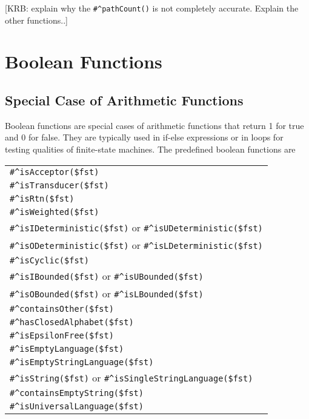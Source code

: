 \vspace{0.5cm}

[KRB:  explain why the \verb!#^pathCount()! is not completely accurate.
Explain the other functions..]  

\section{Boolean Functions}

\subsection{Special Case of Arithmetic Functions}

Boolean functions are special cases of arithmetic functions that return 1 for true and 0 for false.  They
are typically used in if-else expressions or in loops for testing qualities of finite-state machines.
The predefined boolean functions are 

\vspace{0.5cm}

\noindent
\begin{tabular}{|l|}
\hline
\verb!#^isAcceptor($fst)! \\
\verb!#^isTransducer($fst)! \\
\verb!#^isRtn($fst)! \\
\hline
\verb!#^isWeighted($fst)! \\
\verb!#^isIDeterministic($fst)! or \verb!#^isUDeterministic($fst)!\\
\verb!#^isODeterministic($fst)! or \verb!#^isLDeterministic($fst)!\\
\verb!#^isCyclic($fst)!\\
\verb!#^isIBounded($fst)! or \verb!#^isUBounded($fst)!\\
\verb!#^isOBounded($fst)! or \verb!#^isLBounded($fst)!\\
\verb!#^containsOther($fst)! \\
\verb!#^hasClosedAlphabet($fst)! \\
\verb!#^isEpsilonFree($fst)! \\
\hline
\verb!#^isEmptyLanguage($fst)! \\
\verb!#^isEmptyStringLanguage($fst)! \\
\verb!#^isString($fst)! or \verb!#^isSingleStringLanguage($fst)!\\
\verb!#^containsEmptyString($fst)! \\
\verb!#^isUniversalLanguage($fst)! \\
\hline
\end{tabular}

